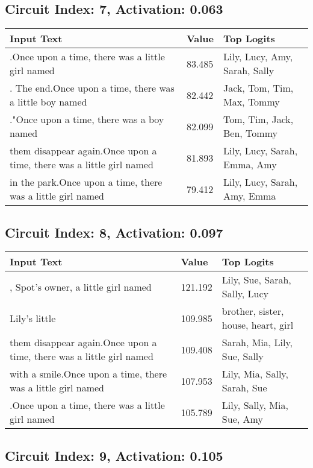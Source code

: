 \documentclass{article}
\begin{document}
\subsection*{Circuit Index: 7, Activation: 0.063}

\begin{longtable}{p{} p{} p{}}
\toprule
\textbf{Input Text} & \textbf{Value} & \textbf{Top Logits} \\
\midrule
.Once upon a time, there was a little girl named & 83.485 & Lily, Lucy, Amy, Sarah, Sally \\
. The end.Once upon a time, there was a little boy named & 82.442 & Jack, Tom, Tim, Max, Tommy \\
."Once upon a time, there was a boy named & 82.099 & Tom, Tim, Jack, Ben, Tommy \\
them disappear again.Once upon a time, there was a little girl named & 81.893 & Lily, Lucy, Sarah, Emma, Amy \\
in the park.Once upon a time, there was a little girl named & 79.412 & Lily, Lucy, Sarah, Amy, Emma \\

\bottomrule
\end{longtable}
\subsection*{Circuit Index: 8, Activation: 0.097}

\begin{longtable}{p{} p{} p{}}
\toprule
\textbf{Input Text} & \textbf{Value} & \textbf{Top Logits} \\
\midrule
, Spot's owner, a little girl named & 121.192 & Lily, Sue, Sarah, Sally, Lucy \\
Lily's little & 109.985 & brother, sister, house, heart, girl \\
them disappear again.Once upon a time, there was a little girl named & 109.408 & Sarah, Mia, Lily, Sue, Sally \\
with a smile.Once upon a time, there was a little girl named & 107.953 & Lily, Mia, Sally, Sarah, Sue \\
.Once upon a time, there was a little girl named & 105.789 & Lily, Sally, Mia, Sue, Amy \\

\bottomrule
\end{longtable}
\subsection*{Circuit Index: 9, Activation: 0.105}
\end{document}
